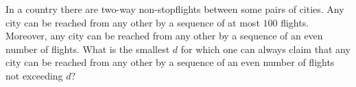In a country there are two-way non-stopflights between some pairs of cities. Any city can be reached from any other by a sequence of at most $100$ flights. Moreover, any city can be reached from any other by a sequence of an even number of flights. What is the smallest $d$ for which one can always claim that any city can be reached from any other by a sequence of an even number of flights not exceeding $d$?